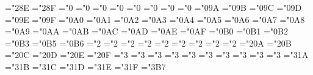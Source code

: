 { \def\bmrbrack{\delimiter"5\mtbmi@@8D\mtbex@@03 }%
 \mathchardef\bmdagger="2\mtbmi@@8E
 \mathchardef\bmddagger="2\mtbmi@@8F
 \mathchardef\bmupalpha="0
 \mathchardef\bmupbeta="0
 \mathchardef\bmupgamma="0
 \mathchardef\bmupdelta="0
 \mathchardef\bmupepsilon="0
 \mathchardef\bmupzeta="0
 \mathchardef\bmupeta="0
 \mathchardef\bmuptheta="0
 \mathchardef\bmupiota="0\mtbmi@@9A
 \mathchardef\bmupkappa="0\mtbmi@@9B
 \mathchardef\bmuplambda="0\mtbmi@@9C
 \mathchardef\bmupmu="0\mtbmi@@9D
 \mathchardef\bmupnu="0\mtbmi@@9E
 \mathchardef\bmupxi="0\mtbmi@@9F
 \mathchardef\bmuppi="0\mtbmi@@ A0
 \mathchardef\bmuprho="0\mtbmi@@ A1
 \mathchardef\bmupsigma="0\mtbmi@@ A2
 \mathchardef\bmuptau="0\mtbmi@@ A3
 \mathchardef\bmupupsilon="0\mtbmi@@ A4
 \mathchardef\bmupphi="0\mtbmi@@ A5
 \mathchardef\bmupchi="0\mtbmi@@ A6
 \mathchardef\bmuppsi="0\mtbmi@@ A7
 \mathchardef\bmupomega="0\mtbmi@@ A8
 \mathchardef\bmupvarepsilon="0\mtbmi@@ A9
 \mathchardef\bmupvartheta="0\mtbmi@@ AA
 \mathchardef\bmupvarpi="0\mtbmi@@ AB
 \mathchardef\bmupvarrho="0\mtbmi@@ AC
 \mathchardef\bmupvarsigma="0\mtbmi@@ AD
 \mathchardef\bmupvarphi="0\mtbmi@@ AE
 \mathchardef\bmupvarkappa="0\mtbmi@@ AF
 \mathchardef\bmvarbeta="0\mtbmi@@ B0
 \mathchardef\bmupvarbeta="0\mtbmi@@ B1
 \mathchardef\bmvardelta="0\mtbmi@@ B2
 \mathchardef\bmupvardelta="0\mtbmi@@ B3
 \mathchardef\bmdbar="0\mtbmi@@ B5
 \mathchardef\bmupdbar="0\mtbmi@@ B6
 \mathchardef\bmcdot="2
 \mathchardef\bmtimes="2
 \mathchardef\bmast="2
 \mathchardef\bmdiv="2
 \mathchardef\bmDiamond="2
 \mathchardef\bmpm="2
 \mathchardef\bmmp="2
 \mathchardef\bmoplus="2
 \mathchardef\bmominus="2
 \mathchardef\bmotimes="2\mtbsy@@0A
 \mathchardef\bmoslash="2\mtbsy@@0B
 \mathchardef\bmodot="2\mtbsy@@0C
 \mathchardef\bmbigcirc="2\mtbsy@@0D
 \mathchardef\bmcirc="2\mtbsy@@0E
 \mathchardef\bmbullet="2\mtbsy@@0F
 \mathchardef\bmasymp="3
 \mathchardef\bmequiv="3
 \mathchardef\bmsubseteq="3
 \mathchardef\bmsupseteq="3
 \mathchardef\bmleq="3 \let\bmle=\bmleq
 \mathchardef\bmgeq="3 \let\bmge=\bmgeq
 \mathchardef\bmpreceq="3
 \mathchardef\bmsucceq="3
 \mathchardef\bmsim="3
 \mathchardef\bmapprox="3
 \mathchardef\bmsubset="3\mtbsy@@1A
 \mathchardef\bmsupset="3\mtbsy@@1B
 \mathchardef\bmll="3\mtbsy@@1C
 \mathchardef\bmgg="3\mtbsy@@1D
 \mathchardef\bmprec="3\mtbsy@@1E
 \mathchardef\bmsucc="3\mtbsy@@1F
 \mathchardef\bmcircdashbullet="3\mtbsy@@ B7
}
